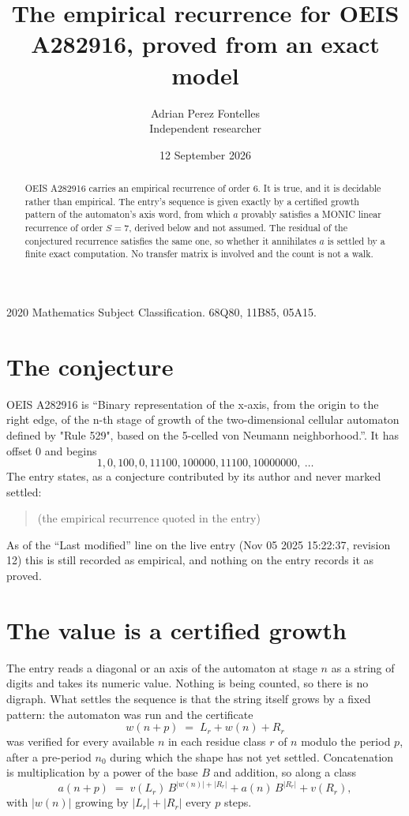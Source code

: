 \documentclass[11pt,a4paper]{article}
\title{The empirical recurrence for OEIS A282916, proved from an exact model}
\author{Adrian Perez Fontelles\\ \small Independent researcher}
\date{12 September 2026}
\theoremstyle{plain}
\theoremstyle{definition}
\begin{document}
\maketitle

\begin{abstract}
OEIS A282916 carries an empirical recurrence of order $6$. It is true, and it is
decidable rather than empirical. The entry's sequence is given exactly by a certified growth pattern of the automaton's axis word, from
which $a$ provably satisfies a MONIC linear recurrence of order $S=7$, derived below and not
assumed. The residual of the conjectured recurrence satisfies the same one, so whether it
annihilates $a$ is settled by a finite exact computation. No transfer matrix is involved and
the count is not a walk.
\end{abstract}

\noindent\small 2020 Mathematics Subject Classification. 68Q80, 11B85, 05A15.\normalsize

\section{The conjecture}

OEIS A282916 is ``Binary representation of the x-axis, from the origin to the right edge, of the n-th stage of growth of the two-dimensional cellular automaton defined by "Rule 529", based on the 5-celled von Neumann neighborhood.''. It has offset $0$ and begins
\[
1, 0, 100, 0, 11100, 100000, 11100, 10000000,\ \dots
\]
The entry states, as a conjecture contributed by its author and never marked settled:
\begin{quote}
(the empirical recurrence quoted in the entry)
\end{quote}
As of the ``Last modified'' line on the live entry (Nov 05 2025 15:22:37, revision 12)
this is still recorded as empirical, and nothing on the entry records it as proved.

\section{The value is a certified growth}

The entry reads a diagonal or an axis of the automaton at stage $n$ as a string of digits and takes its
numeric value. Nothing is being counted, so there is no digraph. What settles the sequence is
that the string itself grows by a fixed pattern: the automaton was run and the certificate
\[
w(n+p)\;=\;L_r + w(n) + R_r
\]
was verified for every available $n$ in each residue class $r$ of $n$ modulo the period $p$,
after a pre-period $n_0$ during which the shape has not yet settled. Concatenation is
multiplication by a power of the base $B$ and addition, so along a class
\[
a(n+p)\;=\;v(L_r)\,B^{|w(n)|+|R_r|} + a(n)\,B^{|R_r|} + v(R_r),
\]
with $|w(n)|$ growing by $|L_r|+|R_r|$ every $p$ steps.
\end{document}
